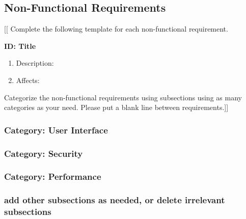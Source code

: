 \subsection{Non-Functional Requirements}

[[ Complete the following template for each non-functional requirement. 


\textbf{ID: Title}
\begin{enumerate}
    \item Description:
    \item Affects: 
\end{enumerate}

Categorize the non-functional requirements using subsections using as many
categories as your need.
Please put a blank line between requirements.]]


\subsubsection{Category: User Interface}

\subsubsection{Category: Security}

\subsubsection{Category: Performance}

\subsubsection{add other subsections as needed, or delete irrelevant subsections}

